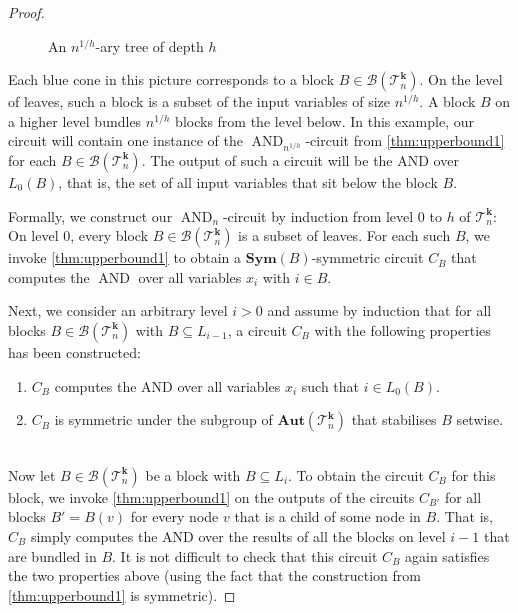 \documentclass[11pt]{article}
\DeclareMathOperator{\AND}{AND}
\newcommand{\Aut}{\mathbf{Aut}}
\newcommand{\Sym}{\mathbf{Sym}}
\newcommand{\Bb}{{\mathcal B}}
\newcommand{\Tt}{{\mathcal T}}
\theoremstyle{definition}
\theoremstyle{plain}
\theoremstyle{remark}
\theoremstyle{remark}
\begin{document}
\begin{proof}
\begin{figure}[h]
\begin{center}
			\end{center}
			\caption*{An $n^{1/h}$-ary tree of depth $h$}
	\end{figure}	
	Each blue cone in this picture corresponds to a block $B \in \Bb(\Tt_n^{\boldsymbol{k}})$. On the level of leaves, such a block is a subset of the input variables of size $n^{1/h}$. A block $B$ on a higher level bundles $n^{1/h}$ blocks from the level below. 
	In this example, our circuit will contain one instance of the $\AND_{n^{1/h}}$-circuit from \cref{thm:upperbound1} for each $B \in \Bb(\Tt_n^{\boldsymbol{k}})$. The output of such a circuit will be the AND over $L_0(B)$, that is, the set of all input variables that sit below the block $B$.
	
	Formally, we construct our $\AND_n$-circuit by induction from level $0$ to $h$ of $\Tt_n^{\boldsymbol{k}}$: On level $0$, every block $B \in \Bb(\Tt_n^{\boldsymbol{k}})$ is a subset of leaves. For each such $B$, we invoke \cref{thm:upperbound1} to obtain a $\Sym(B)$-symmetric circuit $C_B$ that computes the $\AND$ over all variables $x_i$ with $i \in B$. 
	
	Next, we consider an arbitrary level $i > 0$ and assume by induction that for all blocks $B \in \Bb(\Tt_n^{\boldsymbol{k}})$ with $B \subseteq L_{i-1}$, a circuit $C_B$ with the following properties has been constructed:\\
	
	\begin{enumerate}
		\item $C_B$ computes the AND over all variables $x_i$ such that $i \in L_0(B)$.
		\item $C_B$ is symmetric under the subgroup of $\Aut(\Tt_n^{\boldsymbol{k}})$ that stabilises $B$ setwise.
	\end{enumerate}	
	~\\
	Now let $B \in \Bb(\Tt_n^{\boldsymbol{k}})$ be a block with $B \subseteq L_i$. To obtain the circuit $C_B$ for this block, we invoke \cref{thm:upperbound1} on the outputs of the circuits $C_{B'}$ for all blocks $B' = B(v)$ for every node $v$ that is a child of some node in $B$. That is, $C_B$ simply computes the AND over the results of all the blocks on level $i-1$ that are bundled in $B$. 
	It is not difficult to check that this circuit $C_B$ again satisfies the two properties above (using the fact that the construction from \cref{thm:upperbound1} is symmetric). 
	 

\end{proof}
\end{document}

